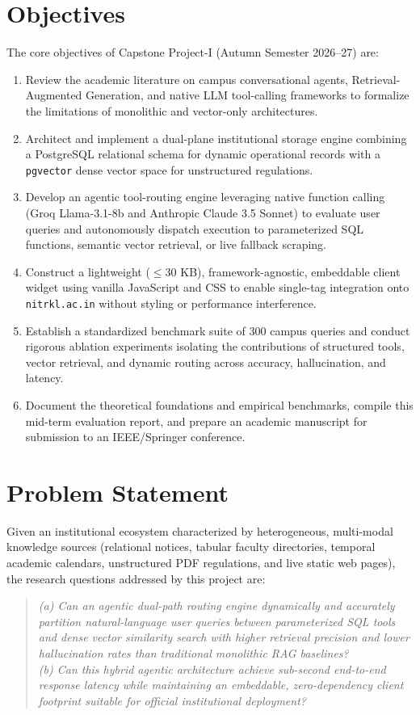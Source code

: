 \documentclass[12pt,a4paper]{report}
\begin{document}
\section{Objectives}
The core objectives of Capstone Project-I (Autumn Semester 2026--27) are:
\begin{enumerate}[label=\textbf{O\arabic*.}]
    \item Review the academic literature on campus conversational agents, Retrieval-Augmented Generation, and native LLM tool-calling frameworks to formalize the limitations of monolithic and vector-only architectures.
    \item Architect and implement a dual-plane institutional storage engine combining a PostgreSQL relational schema for dynamic operational records with a \texttt{pgvector} dense vector space for unstructured regulations.
    \item Develop an agentic tool-routing engine leveraging native function calling (Groq Llama-3.1-8b and Anthropic Claude 3.5 Sonnet) to evaluate user queries and autonomously dispatch execution to parameterized SQL functions, semantic vector retrieval, or live fallback scraping.
    \item Construct a lightweight ($\le$30 KB), framework-agnostic, embeddable client widget using vanilla JavaScript and CSS to enable single-tag integration onto \texttt{nitrkl.ac.in} without styling or performance interference.
    \item Establish a standardized benchmark suite of 300 campus queries and conduct rigorous ablation experiments isolating the contributions of structured tools, vector retrieval, and dynamic routing across accuracy, hallucination, and latency.
    \item Document the theoretical foundations and empirical benchmarks, compile this mid-term evaluation report, and prepare an academic manuscript for submission to an IEEE/Springer conference.
\end{enumerate}

\section{Problem Statement}
Given an institutional ecosystem characterized by heterogeneous, multi-modal knowledge sources (relational notices, tabular faculty directories, temporal academic calendars, unstructured PDF regulations, and live static web pages), the research questions addressed by this project are:
\begin{quote}
\textit{(a) Can an agentic dual-path routing engine dynamically and accurately partition natural-language user queries between parameterized SQL tools and dense vector similarity search with higher retrieval precision and lower hallucination rates than traditional monolithic RAG baselines?} \\
\textit{(b) Can this hybrid agentic architecture achieve sub-second end-to-end response latency while maintaining an embeddable, zero-dependency client footprint suitable for official institutional deployment?}
\end{quote}
\end{document}
